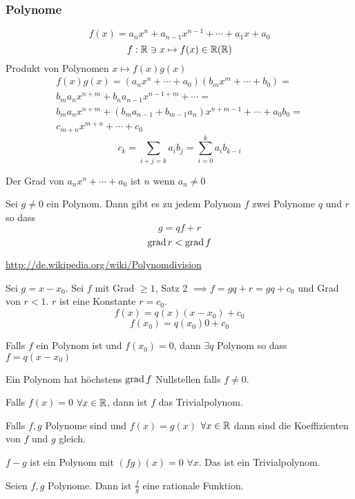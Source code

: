 \subsubsection{Polynome}
\[f(x)=a_nx^n+a_{n-1}x^{n-1}+\cdots+a_1x+a_0\]
\[f:\mathbb{R}\ni x\mapsto f(x)\in\mathbb{R} (\mathbb{R})\]
Produkt von Polynomen $x\mapsto f(x)g(x)$
\begin{align*}
  f(x)g(x)=\left( a_nx^n+\cdots+a_0 \right)\left( b_mx^m+\cdots+b_0 \right)=\\
  b_ma_nx^{n+m}+b_na_{n-1}x^{n-1+m}+\cdots=\\
  b_ma_nx^{n+m}+\left( b_ma_{n-1}+b_{m-1}a_n \right)x^{n+m-1}+\cdots + a_0b_0 =\\
  c_{m+n}x^{m+n} +\cdots +c_0
\end{align*}
\[c_k=\sum_{i+j=k}a_ib_j=\sum_{i=0}^ka_ib_{k-i}\]
\begin{Def}
  Der Grad von $a_nx^n+\cdots+a_0$ ist $n$ wenn $a_n\neq 0$
\end{Def}
\begin{Sat}
  Sei $g\neq 0$ ein Polynom. Dann gibt es zu jedem Polynom $f$ zwei Polynome $q$ und $r$ so dass
  \[g=qf+r\]
  \[\operatorname{grad} r < \operatorname{grad} f\]
\end{Sat}
\begin{Bew}
  \url{http://de.wikipedia.org/wiki/Polynomdivision}
\end{Bew}
\begin{Bem}
  Sei $g=x-x_0$. Sei $f$ mit Grad $\geq 1$, Satz 2 $\implies f=gq+r=gq+c_0$ und Grad von $r < 1$. $r$ ist eine Konstante $r=c_0$.
  \[f(x)=q(x)(x-x_0)+c_0\]
  \[f(x_0)=q(x_0)0+c_0\]
\end{Bem}
\begin{Kor}
  Falls $f$ ein Polynom ist und $f(x_0)=0$, dann $\exists q$ Polynom so dass $f=q(x-x_0)$
\end{Kor}
\begin{Kor}
  Ein Polynom hat höchstens $\operatorname{grad} f$ Nullstellen falls $f\neq 0$.
\end{Kor}
\begin{Kor}
  Falls $f(x)=0$ $\forall x\in\mathbb{R}$, dann ist $f$ das Trivialpolynom.
\end{Kor}
\begin{Kor}
  Falls $f,g$ Polynome sind und $f(x)=g(x)$ $\forall x\in\mathbb{R}$ dann sind die Koeffizienten von $f$ und $g$ gleich.
\end{Kor}
\begin{Bew}
  $f-g$ ist ein Polynom mit $(fg)(x)=0$ $\forall x$. Das ist ein Trivialpolynom.
\end{Bew}
\begin{Def}
  Seien $f,g$ Polynome. Dann ist $\frac{f}{g}$ eine rationale Funktion.
\end{Def}
